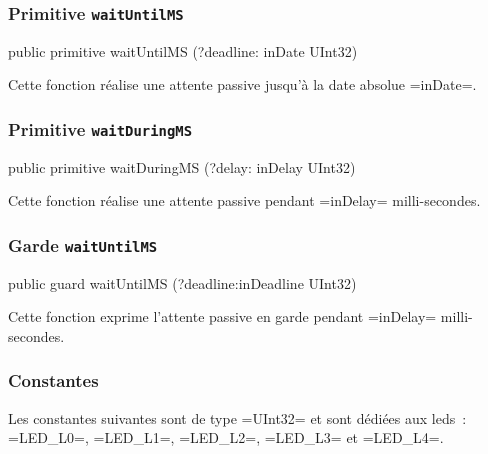 \subsubsection{Primitive \texttt{waitUntilMS}}

\begin{OMNIBUS}
  public primitive waitUntilMS (?deadline: inDate UInt32)
\end{OMNIBUS}

Cette fonction réalise une attente passive jusqu'à la date absolue \omnibus=inDate=.






\subsubsection{Primitive \texttt{waitDuringMS}}

\begin{OMNIBUS}
  public primitive waitDuringMS (?delay: inDelay UInt32)
\end{OMNIBUS}

Cette fonction réalise une attente passive pendant \omnibus=inDelay= milli-secondes.





\subsubsection{Garde \texttt{waitUntilMS}}

\begin{OMNIBUS}
  public guard waitUntilMS (?deadline:inDeadline UInt32)
\end{OMNIBUS}

Cette fonction exprime l'attente passive en garde pendant \omnibus=inDelay= milli-secondes.











\subsubsection{Constantes}

Les constantes suivantes sont de type \omnibus=UInt32= et sont dédiées aux leds~: \omnibus=LED_L0=, \omnibus=LED_L1=, \omnibus=LED_L2=, \omnibus=LED_L3= et \omnibus=LED_L4=.


